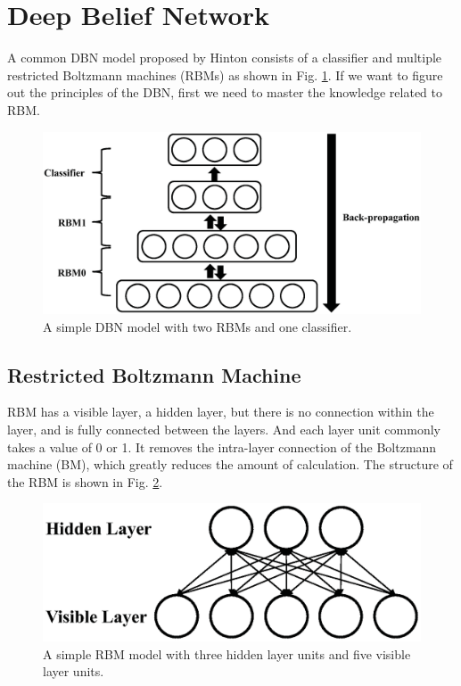 \documentclass{bioinfo}
\begin{document}
\section{Deep Belief Network}
A common DBN model \cite{hinton2006fast} proposed by Hinton consists of a classifier and multiple restricted Boltzmann machines (RBMs) as shown in Fig. \ref{fig:dbn}. If we want to figure out the principles of the DBN, first we need to master the knowledge related to RBM.

\begin{figure}[htbp]
	\centering
	\includegraphics[width=\columnwidth]{dbn.eps}
	\caption{A simple DBN model with two RBMs and one classifier.}
	\label{fig:dbn}
\end{figure}

\subsection{Restricted Boltzmann Machine}
RBM \cite{hinton1986learning} has a visible layer, a hidden layer, but there is no connection within the layer, and is fully connected between the layers. And each layer unit commonly takes a value of 0 or 1. It removes the intra-layer connection of the Boltzmann machine (BM), which greatly reduces the amount of calculation. The structure of the RBM is shown in Fig. \ref{fig:rbm}.
		
\begin{figure}[htbp]
	\centering
	\includegraphics[width=\columnwidth]{rbm.eps}
	\caption{A simple RBM model with three hidden layer units and five visible layer units.}
	\label{fig:rbm}
\end{figure}
	
\end{document}
